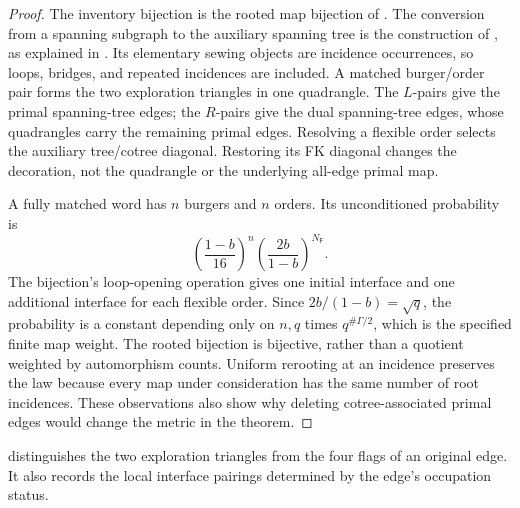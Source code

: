 \documentclass[11pt]{article}
\numberwithin{equation}{section}
\theoremstyle{definition}
\theoremstyle{remark}
\newcommand{\1}{\mathbf 1}
\begin{document}
\begin{proof}
The inventory bijection is the rooted map bijection of
\cite[Sections 4.1--4.2]{SheffieldInventory}.  The conversion from a
spanning subgraph to the auxiliary spanning tree is the construction of
\citet[Section~4]{Bernardi2008Subgraphs}, as explained in
\citet[Section~4.1]{SheffieldInventory}.  Its elementary sewing objects
are incidence occurrences, so loops, bridges, and repeated incidences are
included.  A matched burger/order pair forms the two exploration triangles
in one quadrangle.  The $L$-pairs give the primal spanning-tree edges;
the $R$-pairs give the dual spanning-tree edges, whose quadrangles carry the
remaining primal edges.  Resolving a flexible order selects the auxiliary
tree/cotree diagonal.  Restoring its FK diagonal changes the decoration,
not the quadrangle or the underlying all-edge primal map.

A fully matched word has $n$ burgers and $n$ orders.  Its unconditioned
probability is
\[
 \left(\frac{1-b}{16}\right)^n
 \left(\frac{2b}{1-b}\right)^{N_{\mathsf F}}.
\]
The bijection's loop-opening operation gives one initial interface and one
additional interface for each flexible order.  Since
$2b/(1-b)=\sqrt q$, the probability is a constant depending only on $n,q$
times $q^{\#\Gamma/2}$, which is the specified finite map weight.
The rooted bijection is bijective, rather than a quotient weighted by
automorphism counts.  Uniform rerooting at an incidence preserves the law
because every map under consideration has the same number of root
incidences.  These observations also show why deleting cotree-associated
primal edges would change the metric in the theorem.
\end{proof}

 distinguishes the two exploration triangles
from the four flags of an original edge.  It also records the local
interface pairings determined by the edge's occupation status.
\end{document}
